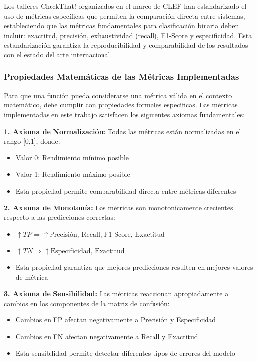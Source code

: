 Los talleres CheckThat! organizados en el marco de CLEF \cite{alam2023overview, barron2023clef} han estandarizado el uso de métricas específicas que permiten la comparación directa entre sistemas, estableciendo que las métricas fundamentales para clasificación binaria deben incluir: exactitud, precisión, exhaustividad (recall), F1-Score y especificidad. Esta estandarización garantiza la reproducibilidad y comparabilidad de los resultados con el estado del arte internacional.

\subsubsection{Propiedades Matemáticas de las Métricas Implementadas}

Para que una función pueda considerarse una métrica válida en el contexto matemático, debe cumplir con propiedades formales específicas. Las métricas implementadas en este trabajo satisfacen los siguientes axiomas fundamentales:

\textbf{1. Axioma de Normalización:}
Todas las métricas están normalizadas en el rango [0,1], donde:
\begin{itemize}
    \item Valor 0: Rendimiento mínimo posible
    \item Valor 1: Rendimiento máximo posible
    \item Esta propiedad permite comparabilidad directa entre métricas diferentes
\end{itemize}

\textbf{2. Axioma de Monotonía:}
Las métricas son monotónicamente crecientes respecto a las predicciones correctas:
\begin{itemize}
    \item $\uparrow TP \Rightarrow \uparrow \text{Precisión, Recall, F1-Score, Exactitud}$
    \item $\uparrow TN \Rightarrow \uparrow \text{Especificidad, Exactitud}$
    \item Esta propiedad garantiza que mejores predicciones resulten en mejores valores de métrica
\end{itemize}

\textbf{3. Axioma de Sensibilidad:}
Las métricas reaccionan apropiadamente a cambios en los componentes de la matriz de confusión:
\begin{itemize}
    \item Cambios en FP afectan negativamente a Precisión y Especificidad
    \item Cambios en FN afectan negativamente a Recall y Exactitud
    \item Esta sensibilidad permite detectar diferentes tipos de errores del modelo
\end{itemize}

